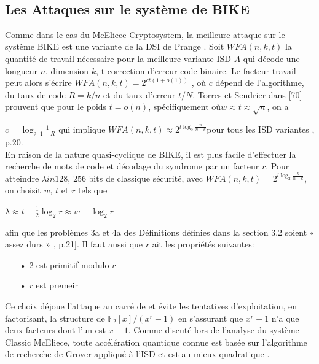 \documentclass[12pt,openany]{report}
\begin{document}
\noindent\hrulefill\\

\subsection{Les Attaques sur le système de BIKE}

Comme dans le cas du McEliece Cryptosystem, la meilleure attaque sur le système BIKE
est une variante de la DSI de Prange \cite{prange23}. Soit $WFA(n, k, t)$ la quantité de travail nécessaire
pour la meilleure variante ISD $ \mathit{A}$ qui décode une longueur $n$, dimension $k$, t-correction d'erreur
code binaire. Le facteur travail peut alors s'écrire
$WFA(n, k, t) = 2^{ct(1+o(1))}$
,
où $c$ dépend de l'algorithme, du taux de code $R = k/n$ et du taux d'erreur $t/N$.
Torres et Sendrier dans [70] prouvent que pour le poids $t = o(n)$, spécifiquement où$ w \approx t \approx\sqrt{n}$, on a 

$ c=\log_2{\frac{1}{1-R}}$ qui implique $WFA(n, k, t) \approx 2^{l\log_2{\frac{n}{n-k}}} $pour tous les ISD
variantes \cite{N.Aragon}, p.20.\\

En raison de la nature quasi-cyclique de BIKE, il est plus facile d'effectuer la recherche de mots de code
et décodage du syndrome par un facteur $r$. Pour atteindre $\lambda in  128$, $256$ bits de classique
sécurité, avec $ W FA(n, k, t) = 2^{l\log_2{\frac{n}{n-k}}} $, on choisit $w$, $t$ et $r$ tels que
\begin{center}
$\lambda \approx t -\frac{1}{2}\log_2r \approx w-\log_2r$
\end{center}
afin que les problèmes 3a et 4a des Définitions définies dans la section 3.2 soient « assez durs » \cite{aragon20},
p.21]. Il faut aussi que $r$ ait les propriétés suivantes:
\begin{itemize}
\item[•] $2$ est primitif modulo $r$
\item[•] $r$ est premeir
\end{itemize}

Ce choix déjoue l'attaque au carré de \cite{londahl2016} et évite les tentatives d'exploitation,
en factorisant, la structure de $\mathbb{F}_2[x]/(x^r-1)$ en s'assurant que $x^r - 1$ n'a que deux
facteurs dont l'un est $x-1$.
Comme discuté lors de l'analyse du système Classic McEliece, toute accélération quantique connue est basée sur l'algorithme de recherche de Grover appliqué à l'ISD et est au mieux
quadratique \cite{aragon20}.
\end{document}

